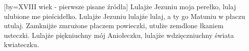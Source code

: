 [by={XVIII wiek - pierwsze pisane źródła}]
\beginverse
Lulajże Jezuniu moja perełko,
lulaj ulubione me pieścidełko.
\endverse
\beginchorus
Lulajże Jezuniu lulajże lulaj,
a ty go Matuniu w płaczu utulaj.
\endchorus
\beginverse
Zamknijże zmrużone płaczem powieczki,
utulże zemdlone łkaniem usteczki.
\endverse
\beginverse
Lulajże piękniuchny mój Aniołeczku,
lulajże wdzięczniuchny świata kwiateczku.
\endverse
\endsong